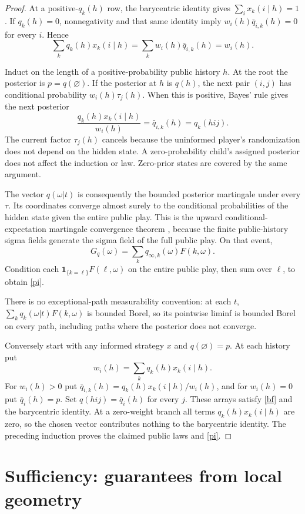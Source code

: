 \documentclass[11pt,a4paper]{article}
\theoremstyle{definition}
\begin{document}
\begin{proof}
At a positive-$q_k(h)$ row, the barycentric identity gives
$\sum_i x_k(i\mid h)=1$. If $q_k(h)=0$, nonnegativity and that same
identity imply $w_i(h)\bar q_{i,k}(h)=0$ for every $i$. Hence
\[
 \sum_k q_k(h)x_k(i\mid h)
 =\sum_k w_i(h)\bar q_{i,k}(h)=w_i(h).
\]

Induct on the length of a positive-probability public history $h$.
At the root the posterior is $p=q(\varnothing)$. If the posterior at $h$
is $q(h)$, the next pair $(i,j)$ has conditional probability
$w_i(h)\tau_j(h)$. When this is positive, Bayes' rule gives the next
posterior
\[
 \frac{q_k(h)x_k(i\mid h)}{w_i(h)}
 =\bar q_{i,k}(h)=q_k(hij).
\]
The current factor $\tau_j(h)$ cancels because the uninformed player's
randomization does not depend on the hidden state. A zero-probability
child's assigned posterior does not affect the induction or law.
Zero-prior states are covered by the same argument.

The vector $q(\omega|t)$ is consequently the bounded posterior
martingale under every $\tau$. Its coordinates converge almost surely
to the conditional probabilities of the hidden state given the entire
public play. This is the upward conditional-expectation martingale
convergence theorem \cite[Theorem~4.6.8]{Durrett}, because the finite public-history sigma fields
generate the sigma field of the full public play. On that event,
\[
 G_q(\omega)=\sum_k q_{\infty,k}(\omega)F(k,\omega).
\]
Condition each $\mathbf1_{\{k=\ell\}}F(\ell,\omega)$ on the entire
public play, then sum over $\ell$, to obtain \eqref{pi}.

There is no exceptional-path measurability convention: at each $t$,
$\sum_k q_k(\omega|t)F(k,\omega)$ is bounded Borel, so its pointwise
liminf is bounded Borel on every path, including paths where the
posterior does not converge.

Conversely start with any informed strategy $x$ and $q(\varnothing)=p$.
At each history put
\[
 w_i(h)=\sum_k q_k(h)x_k(i\mid h).
\]
For $w_i(h)>0$ put
$\bar q_{i,k}(h)=q_k(h)x_k(i\mid h)/w_i(h)$, and for $w_i(h)=0$ put
$\bar q_i(h)=p$. Set $q(hij)=\bar q_i(h)$ for every $j$. These arrays
satisfy \eqref{bf} and the barycentric identity. At a zero-weight branch all terms
$q_k(h)x_k(i\mid h)$ are zero, so the chosen vector contributes nothing
to the barycentric identity. The preceding induction proves the claimed
public laws and \eqref{pi}.
\end{proof}

\section{Sufficiency: guarantees from local geometry}
\end{document}
